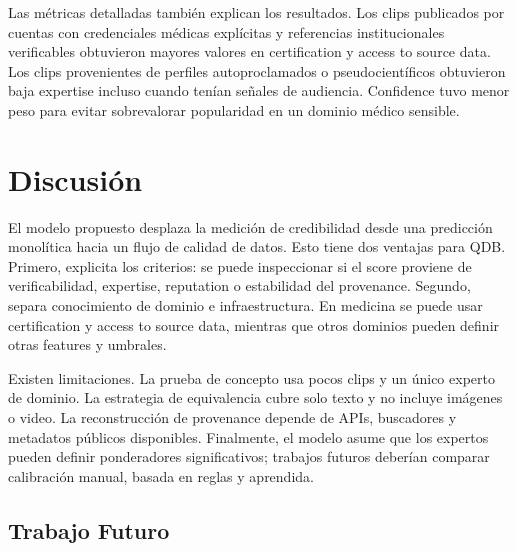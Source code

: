 \documentclass[sigconf, nonacm]{acmart}
\begin{document}
Las m\'etricas detalladas tambi\'en explican los resultados. Los clips publicados por
cuentas con credenciales m\'edicas expl\'icitas y referencias institucionales
verificables obtuvieron mayores valores en certification y access to source data.
Los clips provenientes de perfiles autoproclamados o pseudocient\'ificos obtuvieron
baja expertise incluso cuando ten\'ian se\~nales de audiencia. Confidence tuvo menor
peso para evitar sobrevalorar popularidad en un dominio m\'edico sensible.

\section{Discusi\'on}

El modelo propuesto desplaza la medici\'on de credibilidad desde una predicci\'on
monol\'itica hacia un flujo de calidad de datos. Esto tiene dos ventajas para QDB.
Primero, explicita los criterios: se puede inspeccionar si el score proviene de
verificabilidad, expertise, reputation o estabilidad del provenance. Segundo, separa
conocimiento de dominio e infraestructura. En medicina se puede usar certification
y access to source data, mientras que otros dominios pueden definir otras features y
umbrales.

Existen limitaciones. La prueba de concepto usa pocos clips y un \'unico experto de
dominio. La estrategia de equivalencia cubre solo texto y no incluye im\'agenes o
video. La reconstrucci\'on de provenance depende de APIs, buscadores y metadatos
p\'ublicos disponibles. Finalmente, el modelo asume que los expertos pueden definir
ponderadores significativos; trabajos futuros deber\'ian comparar calibraci\'on
manual, basada en reglas y aprendida.

\subsection{Trabajo Futuro}
\end{document}
